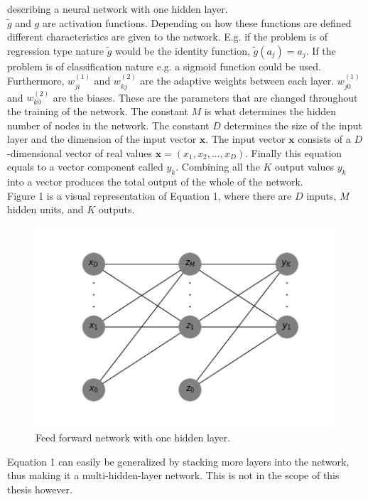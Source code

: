\documentclass[11pt, letterpaper]{amsart}
\begin{document}
describing a neural network with one hidden layer.
\\

$\widetilde{g}$ and $g$ are activation functions. Depending on how these functions are defined different characteristics are given to the network. E.g. if the problem is of regression type nature $\widetilde{g}$ would be the identity function, $\widetilde{g}(a_j) = a_j$. If the problem is of classification nature e.g. a sigmoid function could be used. Furthermore, $w_{ji}^{(1)}$ and $w_{kj}^{(2)}$ are the adaptive weights between each layer. $w_{j0}^{(1)}$ and $w_{k0}^{(2)}$ are the biases. These are the parameters that are changed throughout the training of the network. The constant $M$ is what determines the hidden number of nodes in the network. The constant $D$ determines the size of the input layer and the dimension of the input vector $\textbf{x}$. The input vector $\textbf{x}$ consists of a $D$-dimensional vector of real values $\textbf{x} = (x_1,x_2,...,x_D)$. Finally this equation equals to a vector component called $y_k$. Combining all the $K$ output values $y_k$ into a vector produces the total output of the whole of the network.
\\

Figure 1 is a visual representation of Equation 1, where there are $D$ inputs, $M$ hidden units, and $K$ outputs.

\begin{figure}[H]
\caption{Feed forward network with one hidden layer.}
\centering
\includegraphics[scale=0.7]{Network.png}
\end{figure}

Equation 1 can easily be generalized by stacking more layers into the network, thus making it a multi-hidden-layer network. This is not in the scope of this thesis however.
\end{document}

